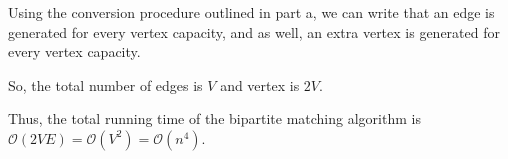 \documentclass[12pt]{article}
\begin{document}
\begin{enumerate}[1.]
\begin{enumerate}[a)]
        \bigskip

        Using the conversion procedure outlined in part a, we can write that an edge is generated
        for every vertex capacity, and as well, an extra vertex is generated for every vertex capacity.

        \bigskip

        So, the total number of edges is $V$ and vertex is $2V$.

        \bigskip

        Thus, the total running time of the bipartite matching algorithm is $\mathcal{O}(2VE) = \mathcal{O}(V^2) = \mathcal{O}(n^4)$.

        \bigskip














\end{enumerate}
\end{enumerate}
\end{document}
